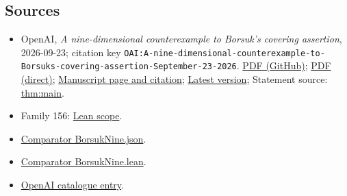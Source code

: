 \documentclass[11pt]{article}
\begin{document}
\subsection{Sources}
\begin{itemize}
\item OpenAI, \emph{A nine-dimensional counterexample to Borsuk's covering assertion}, 2026-09-23; citation key \texttt{OAI:A-nine-dimensional-counterexample-to-Borsuks-covering-assertion-September-23-2026}. \href{https://github.com/openai/math/blob/adc7f1241b42e322a6451854ab7e4b4c146bf78a/preprints/A-nine-dimensional-counterexample-to-Borsuks-covering-assertion-September-23-2026/paper.pdf}{PDF (GitHub)}; \href{https://github.com/openai/math/raw/adc7f1241b42e322a6451854ab7e4b4c146bf78a/preprints/A-nine-dimensional-counterexample-to-Borsuks-covering-assertion-September-23-2026/paper.pdf}{PDF (direct)}; \href{https://github.com/openai/math/blob/adc7f1241b42e322a6451854ab7e4b4c146bf78a/preprints/A-nine-dimensional-counterexample-to-Borsuks-covering-assertion-September-23-2026/README.md}{Manuscript page and citation}; \href{https://github.com/openai/math/blob/main/preprints/A-nine-dimensional-counterexample-to-Borsuks-covering-assertion-September-23-2026/paper.pdf}{Latest version}; Statement source: \href{https://github.com/openai/math/blob/adc7f1241b42e322a6451854ab7e4b4c146bf78a/preprints/A-nine-dimensional-counterexample-to-Borsuks-covering-assertion-September-23-2026/build/sections/introduction.tex\#L18}{thm:main}.
\item Family 156: \href{https://github.com/openai/math/blob/adc7f1241b42e322a6451854ab7e4b4c146bf78a/lean/docs/156.md}{Lean scope}.
\item \href{https://github.com/openai/math/blob/adc7f1241b42e322a6451854ab7e4b4c146bf78a/lean/ComparatorChallenges/BorsukNine.json}{Comparator BorsukNine.json}.
\item \href{https://github.com/openai/math/blob/adc7f1241b42e322a6451854ab7e4b4c146bf78a/lean/ComparatorChallenges/BorsukNine.lean}{Comparator BorsukNine.lean}.
\item \href{https://github.com/openai/math/blob/adc7f1241b42e322a6451854ab7e4b4c146bf78a/CONTENTS.md}{OpenAI catalogue entry}.
\end{itemize}
\end{document}

